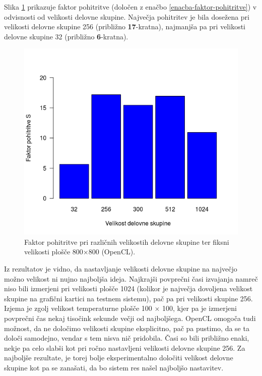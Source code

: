 \documentclass[a4paper,titlepage,11pt]{article}
\begin{document}
Slika \ref{graf-rezultati-pohitritev-4} prikazuje faktor pohitritve (določen z enačbo \ref{enacba-faktor-pohitritve}) v odvisnosti od velikosti delovne skupine. Največja pohitritev je bila dosežena pri velikosti delovne skupine 256 (približno \textbf{17}-kratna), najmanjša pa pri velikosti delovne skupine 32 (približno \textbf{6}-kratna).

\begin{figure}[H]
\begin{center}
\includegraphics[scale=0.55]{graf-rezultati-4_2.png}
\caption{Faktor pohitritve pri različnih velikostih delovne skupine ter fiksni velikosti plošče 800$\times$800 (OpenCL).}
\label{graf-rezultati-pohitritev-4}
\end{center}
\vspace{-25pt}
\end{figure}

Iz rezultatov je vidno, da nastavljanje velikosti delovne skupine na največjo možno velikost ni nujno najboljša ideja. Najkrajši povprečni časi izvajanja namreč niso bili izmerjeni pri velikosti plošče 1024 (kolikor je največja dovoljena velikost skupine na grafični kartici na testnem sistemu), pač pa pri velikosti skupine 256. Izjema je zgolj velikost temperaturne plošče 100 $\times$ 100, kjer pa je izmerjeni povprečni čas nekaj tisočink sekunde večji od najboljšega. OpenCL omogoča tudi možnost, da ne določimo velikosti skupine eksplicitno, pač pa pustimo, da se ta določi samodejno, vendar s tem nisva nič pridobila. Časi so bili približno enaki, nekje pa celo slabši kot pri ročno nastavljeni velikosti delovne skupine 256. Za najboljše rezultate, je torej bolje eksperimentalno določiti velikost delovne skupine kot pa se zanašati, da bo sistem res našel najboljšo nastavitev.
\end{document}
